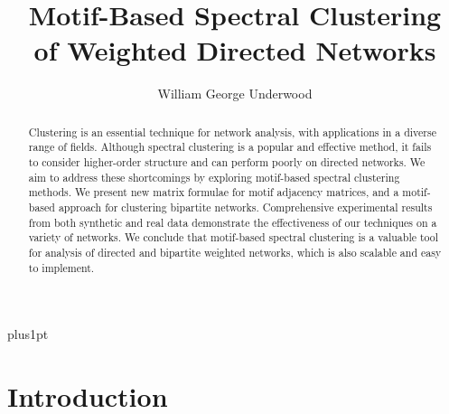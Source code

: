 \documentclass[12pt,draft]{ociamthesis}
\title{Motif\hspace*{0.05cm}-Based Spectral Clustering\\[1ex]
of Weighted Directed Networks}
\author{William George Underwood}
\theoremstyle{plain}
\theoremstyle{definition}
\theoremstyle{remark}
\begin{document}
\baselineskip=18pt plus1pt

\setcounter{secnumdepth}{3}
\setcounter{tocdepth}{2}


\maketitle
\clearpage{}
\begin{abstract}

  Clustering is an essential technique for network analysis, with applications
  in a diverse range of fields. Although spectral clustering is a popular and
  effective method, it fails to consider higher-order structure and can perform
  poorly on directed networks. We aim to address these shortcomings by
  exploring motif-based spectral clustering methods. We present new matrix
  formulae for motif adjacency matrices, and a motif-based approach for
  clustering bipartite networks. Comprehensive experimental results from both
  synthetic and real data demonstrate the effectiveness of our techniques on a
  variety of networks. We conclude that motif-based spectral clustering is a
  valuable tool for analysis of directed and bipartite weighted networks, which
  is also scalable and easy to implement.

\end{abstract}
\clearpage{}

\begin{romanpages}

  \tableofcontents

  \newpage
  \listoffigures

  \newpage
  \listoftables

  \begingroup
  \let\cleardoublepage\relax
  \let\clearpage\relax
  \endgroup

\end{romanpages}

\pagestyle{fancy}
\renewcommand{\chaptermark}[1]{\markboth{#1}{}}

\clearpage{}
\chapter{Introduction}
\end{document}
